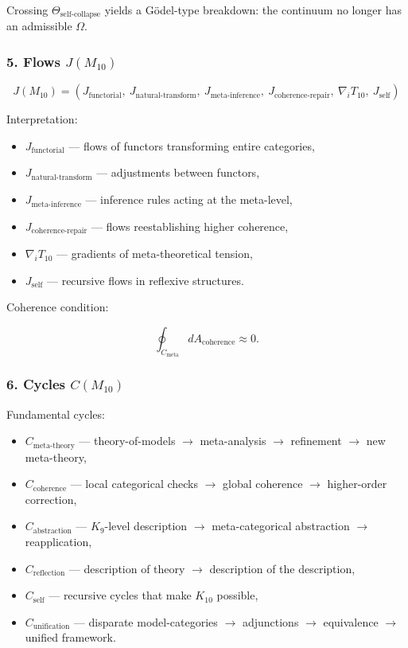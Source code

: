 Crossing $\Theta_{\mathrm{self\mbox{-}collapse}}$ yields a
Gödel-type breakdown:
the continuum no longer has an admissible $\Omega$.

\subsubsection*{5. Flows $J(M_{10})$}

\[
J(M_{10}) =
(J_{\mathrm{functorial}},\
 J_{\mathrm{natural\mbox{-}transform}},\
 J_{\mathrm{meta\mbox{-}inference}},\
 J_{\mathrm{coherence\mbox{-}repair}},\
 \nabla_i T_{10},\
 J_{\mathrm{self}})
\]

Interpretation:

\begin{itemize}
    \item $J_{\mathrm{functorial}}$ — flows of functors transforming entire categories,
    \item $J_{\mathrm{natural\mbox{-}transform}}$ — adjustments between functors,
    \item $J_{\mathrm{meta\mbox{-}inference}}$ — inference rules acting at the meta-level,
    \item $J_{\mathrm{coherence\mbox{-}repair}}$ — flows reestablishing higher coherence,
    \item $\nabla_i T_{10}$ — gradients of meta-theoretical tension,
    \item $J_{\mathrm{self}}$ — recursive flows in reflexive structures.
\end{itemize}

Coherence condition:

\[
\oint_{C_{\mathrm{meta}}} dA_{\mathrm{coherence}} \approx 0.
\]

\subsubsection*{6. Cycles $C(M_{10})$}

Fundamental cycles:

\begin{itemize}
    \item $C_{\mathrm{meta\mbox{-}theory}}$
        — theory-of-models $\to$ meta-analysis $\to$ refinement $\to$ new meta-theory,
    \item $C_{\mathrm{coherence}}$
        — local categorical checks $\to$ global coherence $\to$ higher-order correction,
    \item $C_{\mathrm{abstraction}}$
        — $K_9$-level description $\to$ meta-categorical abstraction $\to$ reapplication,
    \item $C_{\mathrm{reflection}}$
        — description of theory $\to$ description of the description,
    \item $C_{\mathrm{self}}$
        — recursive cycles that make $K_{10}$ possible,
    \item $C_{\mathrm{unification}}$
        — disparate model-categories $\to$ adjunctions $\to$ equivalence $\to$ unified framework.
\end{itemize}

